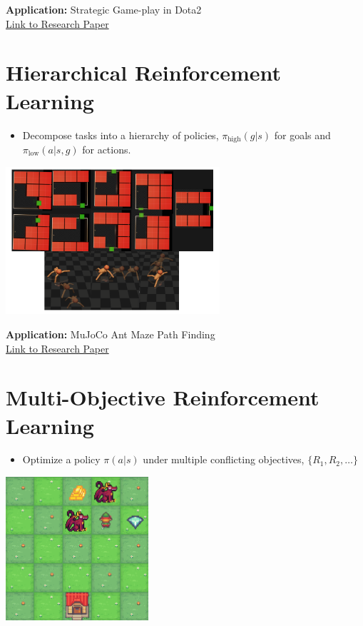 \documentclass[
  letterpaper,
  DIV=11,
  numbers=noendperiod]{scrreprt}
\providecommand{\tightlist}{%
  \setlength{\itemsep}{0pt}\setlength{\parskip}{0pt}}\usepackage{longtable,booktabs,array}
\begin{document}
\textbf{Application:} Strategic Game-play in Dota2\\
\href{https://arxiv.org/pdf/1912.06680}{Link to Research Paper}

\section{Hierarchical Reinforcement
Learning}\label{hierarchical-reinforcement-learning}

\begin{itemize}
\tightlist
\item
  Decompose tasks into a hierarchy of policies, \(\pi_\text{high}(g|s)\)
  for goals and \(\pi_\text{low}(a|s, g)\) for actions.
\end{itemize}

\includegraphics[width=3.125in,height=\textheight,keepaspectratio]{lecture12/images/HierarchicalReinforcementLearning.png}

\textbf{Application:} MuJoCo Ant Maze Path Finding\\
\href{https://arxiv.org/pdf/1710.09767}{Link to Research Paper}

\section{Multi-Objective Reinforcement
Learning}\label{multi-objective-reinforcement-learning}

\begin{itemize}
\tightlist
\item
  Optimize a policy \(\pi(a|s)\) under multiple conflicting objectives,
  \(\{R_1, R_2, \dots\}\)
\end{itemize}

\includegraphics[width=2.08333in,height=\textheight,keepaspectratio]{lecture12/images/MultiObjectiveReinforcementLearning.png}
\end{document}
